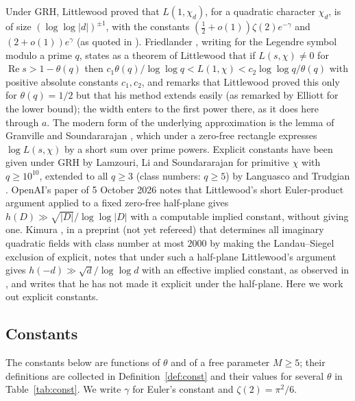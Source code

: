 \documentclass[11pt]{article}
\theoremstyle{definition}
\theoremstyle{remark}
\numberwithin{equation}{section}
\newcommand{\Rea}{\operatorname{Re}}
\begin{document}
Under GRH, Littlewood \cite{littlewood1928} proved that $L(1,\chi_d)$, for a quadratic character $\chi_d$, is of size $(\log\log|d|)^{\pm1}$, with the constants $(\tfrac12+o(1))\zeta(2)e^{-\gamma}$ and $(2+o(1))e^{\gamma}$ (as quoted in \cite[(1.1)]{gs2003}). Friedlander \cite[(1)]{friedlander1977}, writing for the Legendre symbol modulo a prime $q$, states as a theorem of Littlewood that if $L(s,\chi)\ne0$ for $\Rea s>1-\theta(q)$ then $c_1\theta(q)/\log\log q<L(1,\chi)<c_2\log\log q/\theta(q)$ with positive absolute constants $c_1,c_2$, and remarks that Littlewood proved this only for $\theta(q)=1/2$ but that his method extends easily (as remarked by Elliott for the lower bound); the width enters to the first power there, as it does here through $a$. The modern form of the underlying approximation is the lemma of Granville and Soundararajan \cite[Lemma~2.1]{gs2003}, which under a zero-free rectangle expresses $\log L(s,\chi)$ by a short sum over prime powers. Explicit constants have been given under GRH by Lamzouri, Li and Soundararajan \cite{lls2015} for primitive $\chi$ with $q\ge10^{10}$, extended to all $q\ge3$ (class numbers: $q\ge5$) by Languasco and Trudgian \cite{lt2022}. OpenAI's paper of 5 October 2026 \cite[\S1]{openai2026lm} notes that Littlewood's short Euler-product argument applied to a fixed zero-free half-plane gives $h(D)\gg\sqrt{|D|}/\log\log|D|$ with a computable implied constant, without giving one. Kimura \cite[v2, Remark~11]{kimura2026}, in a preprint (not yet refereed) that determines all imaginary quadratic fields with class number at most $2000$ by making the Landau--Siegel exclusion of \cite{openai2026ls} explicit, notes that under such a half-plane Littlewood's argument gives $h(-d)\gg\sqrt d/\log\log d$ with an effective implied constant, as observed in \cite[\S1]{openai2026lm}, and writes that he has not made it explicit under the half-plane. Here we work out explicit constants.

\subsection*{Constants}
The constants below are functions of $\theta$ and of a free parameter $M\ge5$; their definitions are collected in Definition~\ref{def:const} and their values for several $\theta$ in Table~\ref{tab:const}. We write $\gamma$ for Euler's constant and $\zeta(2)=\pi^2/6$.
\end{document}
